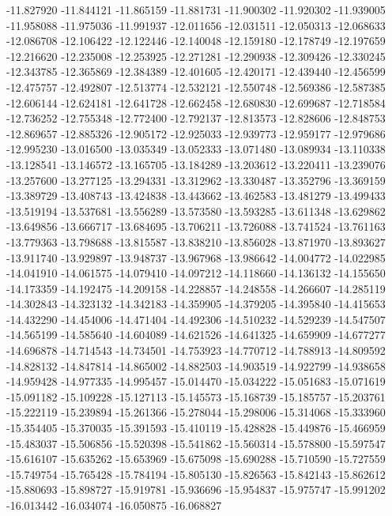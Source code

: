 -11.827920
-11.844121
-11.865159
-11.881731
-11.900302
-11.920302
-11.939005
-11.958088
-11.975036
-11.991937
-12.011656
-12.031511
-12.050313
-12.068633
-12.086708
-12.106422
-12.122446
-12.140048
-12.159180
-12.178749
-12.197659
-12.216620
-12.235008
-12.253925
-12.271281
-12.290938
-12.309426
-12.330245
-12.343785
-12.365869
-12.384389
-12.401605
-12.420171
-12.439440
-12.456599
-12.475757
-12.492807
-12.513774
-12.532121
-12.550748
-12.569386
-12.587385
-12.606144
-12.624181
-12.641728
-12.662458
-12.680830
-12.699687
-12.718584
-12.736252
-12.755348
-12.772400
-12.792137
-12.813573
-12.828606
-12.848753
-12.869657
-12.885326
-12.905172
-12.925033
-12.939773
-12.959177
-12.979686
-12.995230
-13.016500
-13.035349
-13.052333
-13.071480
-13.089934
-13.110338
-13.128541
-13.146572
-13.165705
-13.184289
-13.203612
-13.220411
-13.239076
-13.257600
-13.277125
-13.294331
-13.312962
-13.330487
-13.352796
-13.369159
-13.389729
-13.408743
-13.424838
-13.443662
-13.462583
-13.481279
-13.499433
-13.519194
-13.537681
-13.556289
-13.573580
-13.593285
-13.611348
-13.629862
-13.649856
-13.666717
-13.684695
-13.706211
-13.726088
-13.741524
-13.761163
-13.779363
-13.798688
-13.815587
-13.838210
-13.856028
-13.871970
-13.893627
-13.911740
-13.929897
-13.948737
-13.967968
-13.986642
-14.004772
-14.022985
-14.041910
-14.061575
-14.079410
-14.097212
-14.118660
-14.136132
-14.155650
-14.173359
-14.192475
-14.209158
-14.228857
-14.248558
-14.266607
-14.285119
-14.302843
-14.323132
-14.342183
-14.359905
-14.379205
-14.395840
-14.415653
-14.432290
-14.454006
-14.471404
-14.492306
-14.510232
-14.529239
-14.547507
-14.565199
-14.585640
-14.604089
-14.621526
-14.641325
-14.659909
-14.677277
-14.696878
-14.714543
-14.734501
-14.753923
-14.770712
-14.788913
-14.809592
-14.828132
-14.847814
-14.865002
-14.882503
-14.903519
-14.922799
-14.938658
-14.959428
-14.977335
-14.995457
-15.014470
-15.034222
-15.051683
-15.071619
-15.091182
-15.109228
-15.127113
-15.145573
-15.168739
-15.185757
-15.203761
-15.222119
-15.239894
-15.261366
-15.278044
-15.298006
-15.314068
-15.333960
-15.354405
-15.370035
-15.391593
-15.410119
-15.428828
-15.449876
-15.466959
-15.483037
-15.506856
-15.520398
-15.541862
-15.560314
-15.578800
-15.597547
-15.616107
-15.635262
-15.653969
-15.675098
-15.690288
-15.710590
-15.727559
-15.749754
-15.765428
-15.784194
-15.805130
-15.826563
-15.842143
-15.862612
-15.880693
-15.898727
-15.919781
-15.936696
-15.954837
-15.975747
-15.991202
-16.013442
-16.034074
-16.050875
-16.068827
